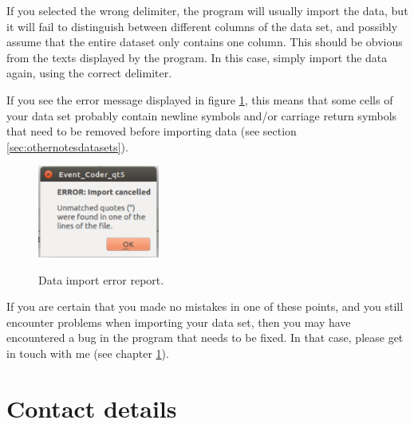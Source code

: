 \documentclass{memoir}
\begin{document}
If you selected the wrong delimiter, the program will usually import the data, but it will fail to distinguish between different columns of the data set, and possibly assume that the entire dataset only contains one column. This should be obvious from the texts displayed by the program. In this case, simply import the data again, using the correct delimiter. 

If you see the error message displayed in figure \ref{fig:importerror}, this means that some cells of your data set probably contain newline symbols and/or carriage return symbols that need to be removed before importing data (see section \ref{sec:othernotesdatasets}).

\begin{figure}[h!]
  \centering
  \caption{Data import error report.}
  \includegraphics[width=40mm]{Screenshot_1.pdf}
  \label{fig:importerror}
\end{figure}

If you are certain that you made no mistakes in one of these points, and you still encounter problems when importing your data set, then you may have encountered a bug in the program that needs to be fixed. In that case, please get in touch with me (see chapter \ref{chap:contactdetails}).


\chapter{Contact details}
\label{chap:contactdetails}
\end{document}
